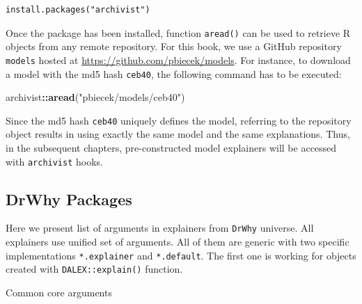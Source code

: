\documentclass[12pt,]{krantz}
\newenvironment{Shaded}{\begin{snugshade}}{\end{snugshade}}
\newcommand{\KeywordTok}[1]{\textcolor[rgb]{0.13,0.29,0.53}{\textbf{#1}}}
\newcommand{\NormalTok}[1]{#1}
\newcommand{\OperatorTok}[1]{\textcolor[rgb]{0.81,0.36,0.00}{\textbf{#1}}}
\newcommand{\StringTok}[1]{\textcolor[rgb]{0.31,0.60,0.02}{#1}}
\theoremstyle{definition}
\theoremstyle{definition}
\theoremstyle{definition}
\theoremstyle{remark}
\begin{document}
\begin{verbatim}
install.packages("archivist")
\end{verbatim}

Once the package has been installed, function \texttt{aread()} can be
used to retrieve R objects from any remote repository. For this book, we
use a GitHub repository \texttt{models} hosted at
\url{https://github.com/pbiecek/models}. For instance, to download a
model with the md5 hash \texttt{ceb40}, the following command has to be
executed:

\begin{Shaded}
\begin{Highlighting}[]
\NormalTok{archivist}\OperatorTok{::}\KeywordTok{aread}\NormalTok{(}\StringTok{"pbiecek/models/ceb40"}\NormalTok{)}
\end{Highlighting}
\end{Shaded}

Since the md5 hash \texttt{ceb40} uniquely defines the model, referring
to the repository object results in using exactly the same model and the
same explanations. Thus, in the subsequent chapters, pre-constructed
model explainers will be accessed with \texttt{archivist} hooks.

\hypertarget{Packages}{%
\subsection{DrWhy Packages}\label{Packages}}

Here we present list of arguments in explainers from \texttt{DrWhy}
universe. All explainers use unified set of arguments. All of them are
generic with two specific implementations \texttt{*.explainer} and
\texttt{*.default}. The first one is working for objects created with
\texttt{DALEX::explain()} function.

Common core arguments
\end{document}
